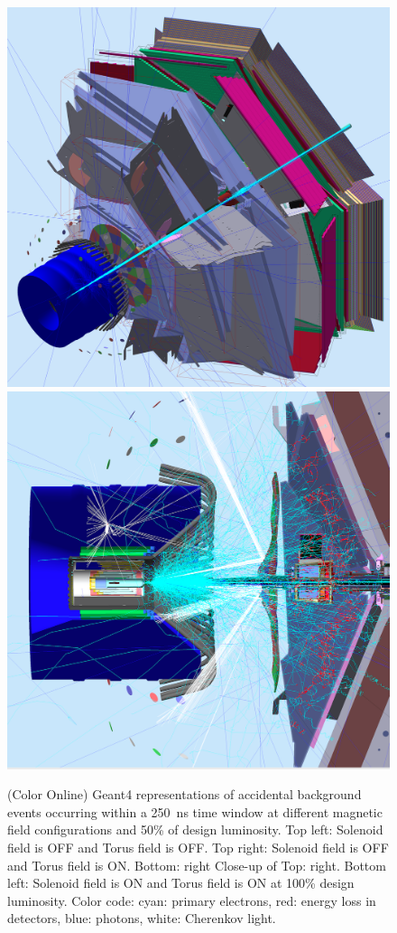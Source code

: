 \documentclass[final,3p,twocolumn]{elsarticle}
\begin{document}
\begin{figure}[htbp!]
\centerline{\includegraphics[width=1.0\columnwidth]{100percentSolenoid.png}
\includegraphics[width=1.0\columnwidth]{50percentNoSolenoidCut3a.png}}
\caption{(Color Online) Geant4 representations of accidental background events occurring within a 250~ns time window at different
magnetic field configurations and 50\% of design luminosity. Top left: Solenoid field is OFF and Torus field is OFF. Top
right: Solenoid field is OFF and Torus field is ON. Bottom: right Close-up of Top: right.  Bottom left: Solenoid field is ON
and Torus field is ON at 100\% design luminosity. Color code: cyan: primary electrons, red: energy loss in detectors, blue:
photons, white: Cherenkov light.} 
\label{gemc-event}
\end{figure}
\end{document}
